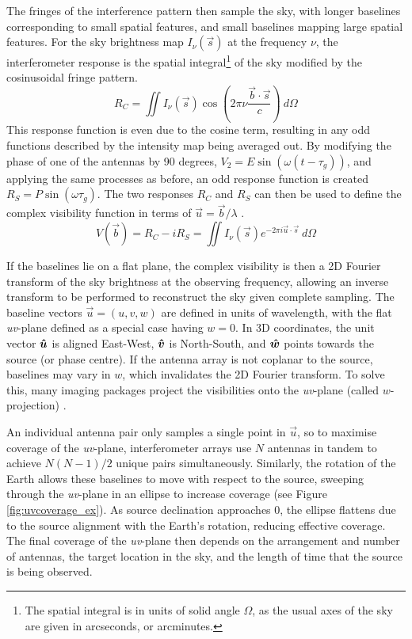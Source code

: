 The fringes of the interference pattern then sample the sky, with longer baselines corresponding to small spatial features, and small baselines mapping large spatial features. For the sky brightness map $I_\nu(\vec s)$ at the frequency $\nu$, the interferometer response is the spatial integral\footnote{The spatial integral is in units of solid angle $\Omega$, as the usual axes of the sky are given in arcseconds, or arcminutes.} of the sky modified by the cosinusoidal fringe pattern. 
\begin{equation}
    R_C = \iint I_\nu(\vec s)\cos\left(2\pi\nu \frac{\vec b \cdot \vec s}{c}\right) \> d\Omega
\end{equation}
This response function is even due to the cosine term, resulting in any odd functions described by the intensity map being averaged out. By modifying the phase of one of the antennas by 90 degrees, $V_2 = E\sin(\omega(t-\tau_g))$, and applying the same processes as before, an odd response function is created $R_S = P\sin(\omega \tau_g)$. The two responses $R_C$ and $R_S$ can then be used to define the complex visibility function in terms of $\vec u = \vec b / \lambda$ \citep{Perley2018}.
\begin{equation}
    V(\vec b) = R_C - iR_S = \iint I_\nu(\vec s)e^{-2\pi i \vec u \cdot \vec s}\> d\Omega
\end{equation}

If the baselines lie on a flat plane, the complex visibility is then a 2D Fourier transform of the sky brightness at the observing frequency, allowing an inverse transform to be performed to reconstruct the sky given complete sampling. The baseline vectors $\vec u = (u, v, w)$ are defined in units of wavelength, with the flat \textit{uv}-plane defined as a special case having $w=0$. In 3D coordinates, the unit vector $\boldsymbol{\hat u}$ is aligned East-West, $\boldsymbol{\hat v}$ is North-South, and $\boldsymbol{\hat w}$ points towards the source (or phase centre). If the antenna array is not coplanar to the source, baselines may vary in $w$, which invalidates the 2D Fourier transform. To solve this, many imaging packages project the visibilities onto the \textit{uv}-plane (called $w$-projection) \citep{Perley2018}. 

An individual antenna pair only samples a single point in $\vec u$, so to maximise coverage of the \textit{uv}-plane, interferometer arrays use $N$ antennas in tandem to achieve $N(N-1)/2$ unique pairs simultaneously. Similarly, the rotation of the Earth allows these baselines to move with respect to the source, sweeping through the \textit{uv}-plane in an ellipse to increase coverage (see Figure \ref{fig:uvcoverage_ex}). As source declination approaches 0\textdegree, the ellipse flattens due to the source alignment with the Earth's rotation, reducing effective coverage. The final coverage of the \textit{uv}-plane then depends on the arrangement and number of antennas, the target location in the sky, and the length of time that the source is being observed.

